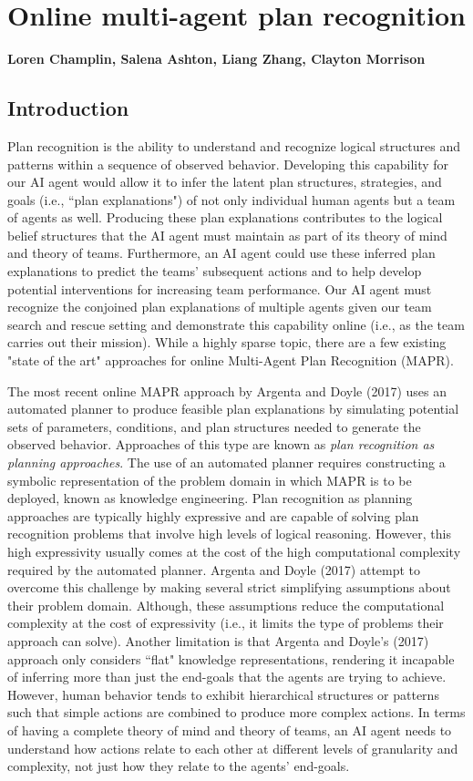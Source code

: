 \chapter{Online multi-agent plan recognition}
\textbf{Loren Champlin, Salena Ashton, Liang Zhang, Clayton Morrison}
\section{Introduction}
Plan recognition is the ability to understand and recognize logical structures and patterns within a sequence of observed behavior. Developing this capability for our AI agent would allow it to infer the latent plan structures, strategies, and goals (i.e., ``plan explanations") of not only individual human agents but a team of agents as well. Producing these plan explanations contributes to the logical belief structures that the AI agent must maintain as part of its theory of mind and theory of teams. Furthermore, an AI agent could use these inferred plan explanations to predict the teams' subsequent actions and to help develop potential interventions for increasing team performance. Our AI agent must recognize the conjoined plan explanations of multiple agents given our team search and rescue setting and demonstrate this capability online (i.e., as the team carries out their mission). While a highly sparse topic, there are a few existing "state of the art" approaches for online Multi-Agent Plan Recognition (MAPR). 

The most recent online MAPR approach by Argenta and Doyle (2017) uses an automated planner to produce feasible plan explanations by simulating potential sets of parameters, conditions, and plan structures needed to generate the observed behavior. Approaches of this type are known as \textit{plan recognition as planning approaches}. The use of an automated planner requires constructing a symbolic representation of the problem domain in which MAPR is to be deployed, known as knowledge engineering. Plan recognition as planning approaches are typically highly expressive and are capable of solving plan recognition problems that involve high levels of logical reasoning. However, this high expressivity usually comes at the cost of the high computational complexity required by the automated planner. Argenta and Doyle (2017) attempt to overcome this challenge by making several strict simplifying assumptions about their problem domain. Although, these assumptions reduce the computational complexity at the cost of expressivity (i.e., it limits the type of problems their approach can solve). Another limitation is that Argenta and Doyle's (2017) approach only considers ``flat" knowledge representations, rendering it incapable of inferring more than just the end-goals that the agents are trying to achieve. However, human behavior tends to exhibit hierarchical structures or patterns such that simple actions are combined to produce more complex actions. In terms of having a complete theory of mind and theory of teams, an AI agent needs to understand how actions relate to each other at different levels of granularity and complexity, not just how they relate to the agents' end-goals. 

